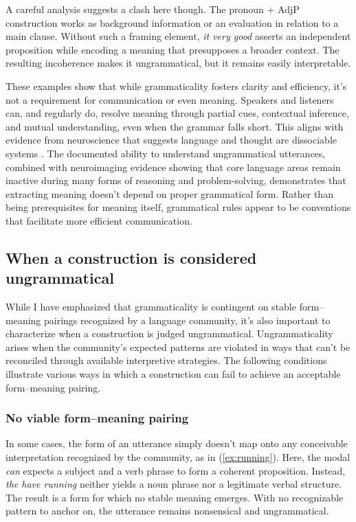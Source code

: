 A careful analysis suggests a clash here though. The pronoun + AdjP construction works as background information or an evaluation in relation to a main clause. Without such a framing element, \textit{it very good} asserts an independent proposition while encoding a meaning that presupposes a broader context. The resulting incoherence makes it ungrammatical, but it remains easily interpretable.

These examples show that while grammaticality fosters clarity and efficiency, it's not a requirement for communication or even meaning. Speakers and listeners can, and regularly do, resolve meaning through partial cues, contextual inference, and mutual understanding, even when the grammar falls short. This aligns with evidence from neuroscience that suggests language and thought are dissociable systems \autocite{Fedorenko2024}. The documented ability to understand ungrammatical utterances, combined with neuroimaging evidence showing that core language areas remain inactive during many forms of reasoning and problem-solving, demonstrates that extracting meaning doesn't depend on proper grammatical form. Rather than being prerequisites for meaning itself, grammatical rules appear to be conventions that facilitate more efficient communication.


\subsection{When a construction is considered ungrammatical}\label{sec:ungrammatical}

While I have emphasized that grammaticality is contingent on stable form--meaning pairings recognized by a language community, it's also important to characterize when a construction is judged ungrammatical. Ungrammaticality arises when the community’s expected patterns are violated in ways that can't be reconciled through available interpretive strategies. The following conditions illustrate various ways in which a construction can fail to achieve an acceptable form--meaning pairing.

\subsubsection{No viable form--meaning pairing}

In some cases, the form of an utterance simply doesn't map onto any conceivable interpretation recognized by the community, as in (\ref{ex:running}).
\label{ex:running}
\z
Here, the modal \textit{can} expects a subject and a verb phrase to form a coherent proposition. Instead, \textit{the have running} neither yields a noun phrase nor a legitimate verbal structure. The result is a form for which no stable meaning emerges. With no recognizable pattern to anchor on, the utterance remains nonsensical and ungrammatical.

